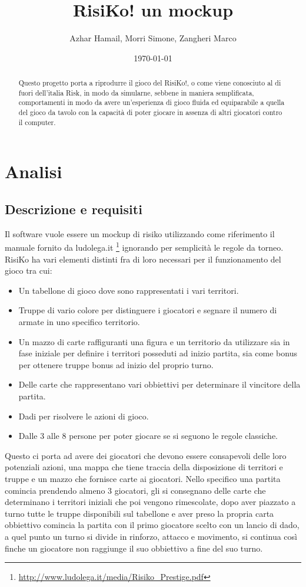 \documentclass[a4paper,12pt]{report}
\title{RisiKo! un mockup}
\author{Azhar Hamail, Morri Simone, Zangheri Marco}
\date{\today}
\begin{document}
\maketitle

\begin{abstract}
Questo progetto porta a riprodurre il gioco del RisiKo!, o come viene conosciuto al di fuori dell'italia Risk, in modo da simularne, sebbene in maniera semplificata, comportamenti in modo da avere un'esperienza di gioco fluida ed equiparabile a quella del gioco da tavolo con la capacità di poter giocare in assenza di altri giocatori contro il computer.
\end{abstract}

\tableofcontents

\chapter{Analisi}
\section{Descrizione e requisiti}
Il software vuole essere un mockup di risiko utilizzando come riferimento il manuale fornito da ludolega.it \footnote{\url{http://www.ludolega.it/media/Risiko_Prestige.pdf}} ignorando per semplicità le regole da torneo.
\newline RisiKo ha vari elementi distinti fra di loro necessari per il funzionamento del gioco tra cui:
\begin{itemize}
\item Un tabellone di gioco dove sono rappresentati i vari territori.
\item Truppe di vario colore per distinguere i giocatori e segnare il numero di armate in uno specifico territorio.
\item Un mazzo di carte raffiguranti una figura e un territorio da utilizzare sia in fase iniziale per definire i territori posseduti ad inizio partita, sia come bonus per ottenere truppe bonus ad inizio del proprio turno.
\item Delle carte che rappresentano vari obbiettivi per determinare il vincitore della partita.
\item Dadi per risolvere le azioni di gioco.
\item Dalle 3 alle 8 persone per poter giocare se si seguono le regole classiche.
\end{itemize}
Questo ci porta ad avere dei giocatori che devono essere consapevoli delle loro potenziali azioni, una mappa che tiene traccia della disposizione di territori e truppe e un mazzo che fornisce carte ai giocatori.
\newline Nello specifico una partita comincia prendendo almeno 3 giocatori, gli si consegnano delle carte che determinano i territori iniziali che poi vengono rimescolate, dopo aver piazzato a turno tutte le truppe disponibili sul tabellone e aver preso la propria carta obbiettivo comincia la partita con il primo giocatore scelto con un lancio di dado, a quel punto un turno si divide in rinforzo, attacco e movimento, si continua così finche un giocatore non raggiunge il suo obbiettivo a fine del suo turno.
\end{document}
